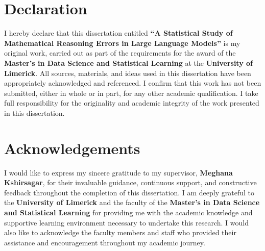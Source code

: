 \documentclass[a4paper,11pt,twoside]{report}
\begin{document}
\singlespacing
\hypersetup{pageanchor=true}
\setcounter{page}{1}

\chapter*{Declaration}
I hereby declare that this dissertation entitled \textbf{``A Statistical
Study of Mathematical Reasoning Errors in Large Language Models''} is my
original work, carried out as part of the requirements for the award of
the \textbf{Master's in Data Science and Statistical Learning} at the
\textbf{University of Limerick}. All sources, materials, and ideas used
in this dissertation have been appropriately acknowledged and
referenced. I confirm that this work has not been submitted, either in
whole or in part, for any other academic qualification. I take full
responsibility for the originality and academic integrity of the work
presented in this dissertation.

\newpage

\chapter*{Acknowledgements}
I would like to express my sincere gratitude to my supervisor,
\textbf{Meghana Kshirsagar}, for their invaluable guidance, continuous
support, and constructive feedback throughout the completion of this
dissertation. I am deeply grateful to the \textbf{University of
Limerick} and the faculty of the \textbf{Master's in Data Science and
Statistical Learning} for providing me with the academic knowledge and
supportive learning environment necessary to undertake this research. I
would also like to acknowledge the faculty members and staff who
provided their assistance and encouragement throughout my academic
journey.

\newpage
\end{document}
